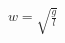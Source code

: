 \documentclass[preview]{standalone}
\begin{document}
\begin{align*}
w = \sqrt{\frac{g}{l}}
\end{align*}
\end{document}
